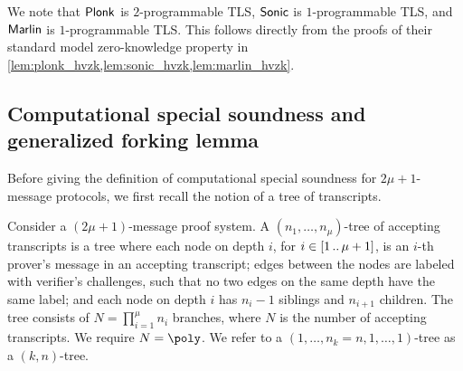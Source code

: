 We note that $\textnormal{\textsf{Plonk}}$ is $2$-programmable TLS, ${\textnormal{\textsf{Sonic}}}$ is $1$-programmable TLS,
and ${\textnormal{\textsf{Marlin}}}$ is $1$-programmable TLS. This follows directly from the proofs of
their standard model zero-knowledge property in
\cref{lem:plonk_hvzk,lem:sonic_hvzk,lem:marlin_hvzk}. 

\subsection{Computational special soundness and generalized forking lemma}

Before giving the definition of computational special soundness for $2\mu + 1$-message protocols, we first recall the notion of a tree of transcripts.
\begin{definition}
	\label{def:tree_of_accepting_transcripts}
	Consider a $(2\mu + 1)$-message proof system. A $(n_1,
  \ldots, n_\mu)$-tree of accepting transcripts is a tree where each node on
  depth $i$, for $i \in [1 \, .. \, \mu + 1]$, is an $i$-th prover's message in an
  accepting transcript; edges between the nodes are labeled with verifier's
  challenges, such that no two edges on the same depth have the same
  label; and each node on depth $i$ has $n_{i} - 1$ siblings and $n_{i +
    1}$ children. The tree consists of $N = \prod_{i = 1}^\mu n_i$
  branches, where $N$ is the number of accepting transcripts. We require $N = \poly$. We refer to a $(1, \ldots, n_k=n, 1, \ldots, 1)$-tree as a $(k,n)$-tree.
\end{definition}

\iffalse
		
